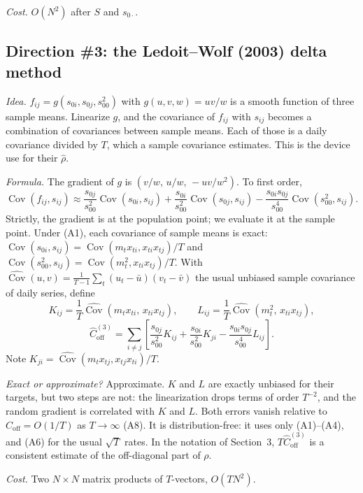 \documentclass[11pt]{article}
\theoremstyle{remark}
\begin{document}
\emph{Cost.} $O(N^2)$ after $S$ and $s_{0\cdot}$.

\subsection{Direction \#3: the Ledoit--Wolf (2003) delta method}

\emph{Idea.} $f_{ij} = g(s_{0i}, s_{0j}, s_{00}^2)$ with $g(u,v,w) = uv/w$ is a smooth function of three sample means. Linearize $g$, and the covariance of $f_{ij}$ with $s_{ij}$ becomes a combination of covariances between sample means. Each of those is a daily covariance divided by $T$, which a sample covariance estimates. This is the device \citet{ledoit2003} use for their $\hat\rho$.

\emph{Formula.} The gradient of $g$ is $(v/w,\, u/w,\, -uv/w^2)$. To first order,
\[
  \operatorname{Cov}(f_{ij}, s_{ij}) \approx \frac{s_{0j}}{s_{00}^2}\operatorname{Cov}(s_{0i}, s_{ij}) + \frac{s_{0i}}{s_{00}^2}\operatorname{Cov}(s_{0j}, s_{ij}) - \frac{s_{0i}s_{0j}}{s_{00}^4}\operatorname{Cov}(s_{00}^2, s_{ij}).
\]
Strictly, the gradient is at the population point; we evaluate it at the sample point. Under (A1), each covariance of sample means is exact: $\operatorname{Cov}(s_{0i}, s_{ij}) = \operatorname{Cov}(m_tx_{ti}, x_{ti}x_{tj})/T$ and $\operatorname{Cov}(s_{00}^2, s_{ij}) = \operatorname{Cov}(m_t^2, x_{ti}x_{tj})/T$. With $\widehat{\operatorname{Cov}}(u,v) = \frac{1}{T-1}\sum_t(u_t - \bar u)(v_t - \bar v)$ the usual unbiased sample covariance of daily series, define
\[
  K_{ij} = \frac{1}{T}\widehat{\operatorname{Cov}}(m_tx_{ti},\, x_{ti}x_{tj}), \qquad
  L_{ij} = \frac{1}{T}\widehat{\operatorname{Cov}}(m_t^2,\, x_{ti}x_{tj}),
\]
\[
  \hat C_{\mathrm{off}}^{(3)} = \sum_{i \ne j}\left[\frac{s_{0j}}{s_{00}^2}K_{ij} + \frac{s_{0i}}{s_{00}^2}K_{ji} - \frac{s_{0i}s_{0j}}{s_{00}^4}L_{ij}\right].
\]
Note $K_{ji} = \widehat{\operatorname{Cov}}(m_tx_{tj}, x_{tj}x_{ti})/T$.

\emph{Exact or approximate?} Approximate. $K$ and $L$ are exactly unbiased for their targets, but two steps are not: the linearization drops terms of order $T^{-2}$, and the random gradient is correlated with $K$ and $L$. Both errors vanish relative to $C_{\mathrm{off}} = O(1/T)$ as $T \to \infty$ (A8). It is distribution-free: it uses only (A1)--(A4), and (A6) for the usual $\sqrt T$ rates. In the notation of Section~3, $T\hat C_{\mathrm{off}}^{(3)}$ is a consistent estimate of the off-diagonal part of $\rho$.

\emph{Cost.} Two $N \times N$ matrix products of $T$-vectors, $O(TN^2)$.
\end{document}
